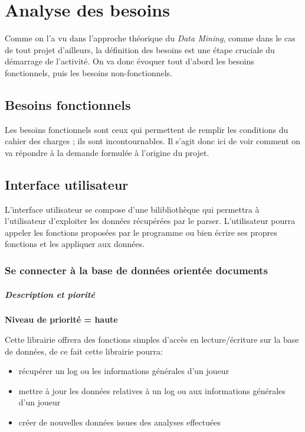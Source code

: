 \chapter{Analyse des besoins}


Comme on l'a vu dans l'approche théorique du \textit{Data Mining}, comme dans le cas de tout projet d'ailleurs, la définition des besoins est une étape cruciale du démarrage de l'activité. On va donc évoquer tout d'abord les besoins fonctionnels, puis les besoins non-fonctionnels.


\section{Besoins fonctionnels} 
Les besoins fonctionnels sont ceux qui permettent de remplir les conditions du cahier des charges ; ils sont incontournables. Il s'agit donc ici de voir comment on va répondre à la demande formulée à l'origine du projet.

\section{Interface utilisateur}
L'interface utilisateur se compose d'une bilibliothèque qui permettra à l'utilisateur d'exploiter les données récupérées par le parser. L'utilisateur pourra appeler les fonctions proposées par le programme ou bien écrire ses propres fonctions et les appliquer aux données.

\subsection{Se connecter à la base de données orientée documents}

\paragraph*{Description et piorité}

\textbf{Niveau de priorité = haute}

Cette librairie offrera des fonctions simples d'accès en lecture/écriture sur la base de données, de ce fait cette librairie pourra:
\begin{itemize}
\item récupérer un log ou les informations générales d'un joueur
\item mettre à jour les données relatives à un log ou aux informations générales d'un joueur
\item créer de nouvelles données issues des analyses effectuées
\end{itemize}

